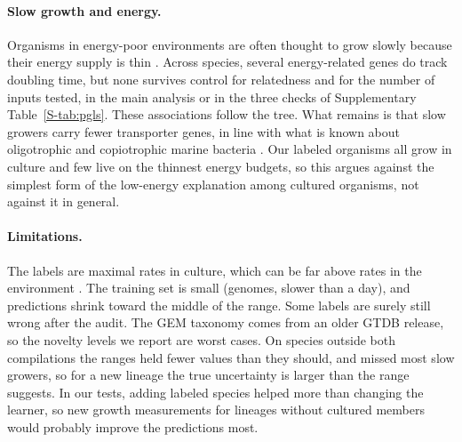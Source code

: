 \paragraph{Slow growth and energy.} Organisms in energy-poor environments are often thought to grow slowly because their
energy supply is thin \citep{hoehler2013,lever2015}. Across species, several energy-related genes do track doubling time, but
none survives control for relatedness and for the number of inputs tested, in the main analysis or in the three checks of
Supplementary Table~\ref{S-tab:pgls}. These associations follow the tree. What remains is that slow growers carry fewer
transporter genes, in line with what is known about oligotrophic and copiotrophic marine bacteria \citep{lauro2009}. Our
labeled organisms all grow in culture and few live on the thinnest energy budgets, so this argues against the simplest form
of the low-energy explanation among cultured organisms, not against it in general.

\paragraph{Limitations.} The labels are maximal rates in culture, which can be far above rates in the environment
\citep{gibson2018,brown2016}. The training set is small (\NGenomes genomes, \NSlow slower than a day), and predictions shrink
toward the middle of the range. Some labels are surely still wrong after the audit. The GEM taxonomy comes from an older GTDB
release, so the novelty levels we report are worst cases. On species outside both compilations the ranges held fewer values
than they should, and missed most slow growers, so for a new lineage the true uncertainty is larger than the range suggests. In our tests, adding labeled species helped more than changing the learner, so new growth measurements for lineages
without cultured members would probably improve the predictions most.
